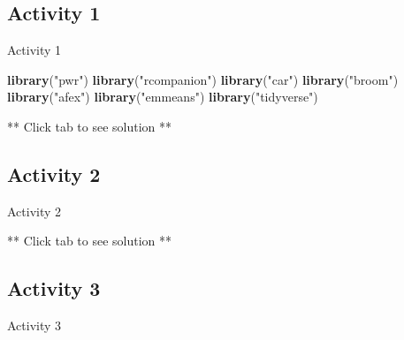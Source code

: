 \documentclass[]{book}
\newenvironment{Shaded}{\begin{snugshade}}{\end{snugshade}}
\newcommand{\DataTypeTok}[1]{\textcolor[rgb]{0.13,0.29,0.53}{#1}}
\newcommand{\KeywordTok}[1]{\textcolor[rgb]{0.13,0.29,0.53}{\textbf{#1}}}
\newcommand{\NormalTok}[1]{#1}
\newcommand{\OperatorTok}[1]{\textcolor[rgb]{0.81,0.36,0.00}{\textbf{#1}}}
\newcommand{\StringTok}[1]{\textcolor[rgb]{0.31,0.60,0.02}{#1}}
\begin{document}
\hypertarget{activity-1-7}{%
\subsection{Activity 1}\label{activity-1-7}}

Activity 1

\begin{Shaded}
\begin{Highlighting}[]
\KeywordTok{library}\NormalTok{(}\StringTok{"pwr"}\NormalTok{)}
\KeywordTok{library}\NormalTok{(}\StringTok{"rcompanion"}\NormalTok{)}
\KeywordTok{library}\NormalTok{(}\StringTok{"car"}\NormalTok{)}
\KeywordTok{library}\NormalTok{(}\StringTok{"broom"}\NormalTok{)}
\KeywordTok{library}\NormalTok{(}\StringTok{"afex"}\NormalTok{)}
\KeywordTok{library}\NormalTok{(}\StringTok{"emmeans"}\NormalTok{)}
\KeywordTok{library}\NormalTok{(}\StringTok{"tidyverse"}\NormalTok{)}
\end{Highlighting}
\end{Shaded}

** Click tab to see solution **

\hypertarget{activity-2-5}{%
\subsection{Activity 2}\label{activity-2-5}}

Activity 2

\begin{Shaded}
\end{Shaded}

** Click tab to see solution **

\hypertarget{activity-3-5}{%
\subsection{Activity 3}\label{activity-3-5}}

Activity 3
\end{document}
